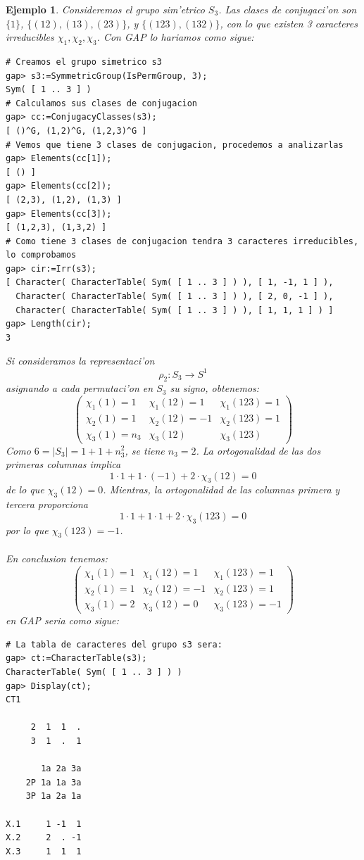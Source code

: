 \documentclass[a4paper,openright,12pt]{book}
\numberwithin{equation}{section} %
\newtheorem{ejemplo}{Ejemplo}[section] %
\begin{document}
\begin{ejemplo}
Consideremos el grupo sim'etrico $S_{3}$. Las clases de conjugaci'on son $\{1\}$, $\{(12),(13),(23)\}$, y $\{(123),(132)\}$, con lo que existen 3 caracteres irreducibles $\chi_{1}, \chi_{2}, \chi_{3}$. Con GAP lo hariamos como sigue:
\begin{verbatim}
# Creamos el grupo simetrico s3
gap> s3:=SymmetricGroup(IsPermGroup, 3);
Sym( [ 1 .. 3 ] )
# Calculamos sus clases de conjugacion
gap> cc:=ConjugacyClasses(s3);
[ ()^G, (1,2)^G, (1,2,3)^G ]
# Vemos que tiene 3 clases de conjugacion, procedemos a analizarlas
gap> Elements(cc[1]);
[ () ]
gap> Elements(cc[2]);
[ (2,3), (1,2), (1,3) ]
gap> Elements(cc[3]);
[ (1,2,3), (1,3,2) ]
# Como tiene 3 clases de conjugacion tendra 3 caracteres irreducibles, lo comprobamos
gap> cir:=Irr(s3);
[ Character( CharacterTable( Sym( [ 1 .. 3 ] ) ), [ 1, -1, 1 ] ), 
  Character( CharacterTable( Sym( [ 1 .. 3 ] ) ), [ 2, 0, -1 ] ), 
  Character( CharacterTable( Sym( [ 1 .. 3 ] ) ), [ 1, 1, 1 ] ) ]
gap> Length(cir);
3
\end{verbatim}
Si consideramos la representaci'on 
\[
\rho_{2} : S_{3} \rightarrow S^{1}
\]
asignando a cada permutaci'on en $S_{3}$ su signo, obtenemos:
\[
\left( \begin{array}{ccc}
\chi_{1}(1)=1 & \chi_{1}(12)=1 & \chi_{1}(123)=1 \\
\chi_{2}(1)=1 & \chi_{2}(12)=-1 & \chi_{2}(123)=1 \\
\chi_{3}(1)=n_{3}& \chi_{3}(12) & \chi_{3}(123) \end{array} \right)
\]
Como $6=|S_{3}|=1+1+n_{3}^{2}$, se tiene $n_{3}=2$. La ortogonalidad de las dos primeras columnas implica 
\[
1 \cdot 1 +1 \cdot (-1)+2 \cdot \chi_{3}(12)=0
\]
de lo que $\chi_{3}(12)=0$. Mientras, la ortogonalidad de las columnas primera y tercera proporciona
\[
1 \cdot 1 +1 \cdot 1 +2 \cdot \chi_{3}(123)=0
\]
por lo que $\chi_{3}(123)=-1$.\\
\\
En conclusion tenemos:
\[
\left( \begin{array}{ccc}
\chi_{1}(1)=1 & \chi_{1}(12)=1 & \chi_{1}(123)=1 \\
\chi_{2}(1)=1 & \chi_{2}(12)=-1 & \chi_{2}(123)=1 \\
\chi_{3}(1)=2& \chi_{3}(12)=0 & \chi_{3}(123)=-1 \end{array} \right)
\]
en GAP seria como sigue:
\begin{verbatim}
# La tabla de caracteres del grupo s3 sera:
gap> ct:=CharacterTable(s3);
CharacterTable( Sym( [ 1 .. 3 ] ) )
gap> Display(ct);
CT1

     2  1  1  .
     3  1  .  1

       1a 2a 3a
    2P 1a 1a 3a
    3P 1a 2a 1a

X.1     1 -1  1
X.2     2  . -1
X.3     1  1  1
\end{verbatim}
\end{ejemplo}
\end{document}
